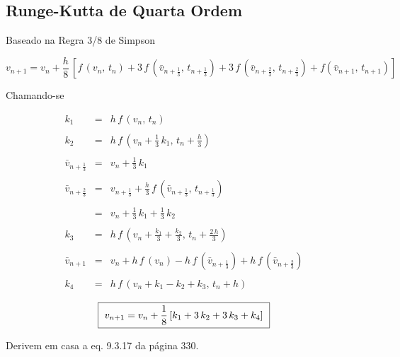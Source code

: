 \subsection{Runge-Kutta de Quarta Ordem}

Baseado na Regra 3/8 de Simpson

\[
 v_{n+1} = v_n + \frac{h}{8} \, [f \, (v_n, \, t_n) + 3 \, f \, (\bar{v}_{n+\frac{1}{3}}, \, t_{n+\frac{1}{3}}) + 3 \, f \, (\bar{v}_{n+\frac{2}{3}}, \, t_{n+\frac{2}{3}}) + f(\bar{v}_{n+1}, \, t_{n+1})]
\]

Chamando-se

\begin{eqnarray}
 k_1 & = & h \, f \, (v_n , \, t_n) \nonumber \\
 \nonumber \\
 k_2 & = & h \, f \, \left(v_n + \frac{1}{3} \, k_1, \, t_n + \frac{h}{3}\right) \nonumber \\
 \nonumber \\
 \bar{v}_{n+\frac{1}{3}} & = & v_n + \frac{1}{3} \, k_1 \nonumber \\
 \nonumber \\
 \bar{v}_{n+\frac{2}{3}} & = & v_{n+\frac{1}{3}} + \frac{h}{3} \, f \, (\bar{v}_{n+\frac{1}{3}}, \, t_{n+\frac{1}{3}}) \nonumber \\
 \nonumber \\
 & = & v_n + \frac{1}{3} \, k_1 + \frac{1}{3} \, k_2 \nonumber \\
 \nonumber \\
 k_3 & = & h \, f \, \left(v_n + \frac{k_1}{3} + \frac{k_2}{3}, \, t_n + \frac{2 \, h}{3}\right) \nonumber \\
 \nonumber \\
 \bar{v}_{n+1} & = & v_n + h \, f \, (v_n) - h \, f \, (\bar{v}_{n+\frac{1}{3}}) + h \, f \, (\bar{v}_{n+\frac{2}{3}}) \nonumber \\
 \nonumber \\
 k_4 & = & h \, f \, (v_n + k_1 - k_2 + k_3, \, t_n + h) \nonumber 
\end{eqnarray}

\[
 \mbox{ \framebox{ $ v_{n+1} = v_n + \displaystyle \frac{1}{8} \, [k_1 + 3 \, k_2 + 3 \, k_3 + k_4] $ } }
\]


Derivem em casa a eq. 9.3.17 da página 330.